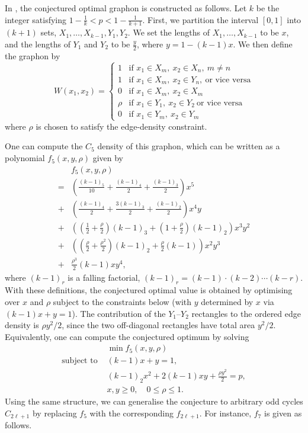 \documentclass{article}
\theoremstyle{plain}
\theoremstyle{definition}
\theoremstyle{remark}
\begin{document}
In \citet{bennett2020minimizing}, the conjectured optimal graphon is constructed as follows.
Let $k$ be the integer satisfying $1 - \frac{1}{k} < p < 1-\frac{1}{k+1}$.
First, we partition the interval $[0,1]$ into $(k+1)$ sets, $X_1, \ldots, X_{k-1}, Y_1, Y_2$.
We set the lengths of $X_1,\ldots,X_{k-1}$ to be $x$, and the lengths of $Y_1$ and $Y_2$ to be $\frac{y}{2}$, where $y=1-(k-1)x$.
We then define the graphon by
\[
  W(x_1, x_2) = \begin{cases}
    1 & \text{if } x_1 \in X_m,\ x_2 \in X_n,\ m \neq n
    \\
    1 & \text{if } x_1 \in X_m,\ x_2 \in Y_n,\ \text{or vice versa}
    \\
    0 & \text{if } x_1 \in X_m,\ x_2 \in X_m
    \\
    \rho & \text{if } x_1 \in Y_1,\ x_2 \in Y_2\ \text{or vice versa}
    \\
    0 & \text{if } x_1 \in Y_m,\ x_2 \in Y_m
  \end{cases}
\]
where $\rho$ is chosen to satisfy the edge-density constraint.

One can compute the $C_5$ density of this graphon, which can be written as a polynomial $f_5(x, y, \rho)$ given by
\begin{align*}
    &f_5(x, y, \rho)
    \\
    {} = &\left(\frac{(k-1)_5}{10} + \frac{(k-1)_4}{2} + \frac{(k-1)_3}{2} \right)x^5
    \\
    {} + &\left( \frac{(k-1)_4}{2} + \frac{3(k-1)_3}{2} + \frac{(k-1)_2}{2}\right)x^4 y
    \\
    {} + &\left(\left(\frac{1}{2} + \frac{\rho}{2}\right) (k-1)_3 + \left(1 + \frac{\rho}{2}\right) (k-1)_2\right) x^3 y^2
    \\
    {} + &\left( \left(\frac{\rho}{2} + \frac{\rho^2}{2}\right) (k-1)_2 + \frac{\rho}{2}(k-1) \right) x^2 y^3
    \\
    {} + &\frac{\rho^3}{2} (k-1) xy^4,
\end{align*}
where $(k-1)_r$ is a falling factorial, $(k-1)_r = (k-1) \cdot (k-2) \cdots (k-r)$. 
With these definitions, the conjectured optimal value is obtained by optimising over $x$ and $\rho$ subject to the constraints below (with $y$ determined by $x$ via $(k-1)x + y = 1$).
The contribution of the $Y_1$--$Y_2$ rectangles to the ordered edge density is $\rho y^2/2$, since the two off-diagonal rectangles have total area $y^2/2$.
Equivalently, one can compute the conjectured optimum by solving
\begin{align*}
    &\min f_5(x, y, \rho)
    \\
  \text{subject to } & (k-1) x + y = 1, 
    \\
    & (k-1)_2 x^2 + 2 (k-1) xy + \frac{\rho y^2}{2} = p,
    \\
    & x, y \ge 0, \quad 0 \le \rho \le 1.
\end{align*}
Using the same structure, we can generalise the conjecture to arbitrary odd cycles $C_{2\ell+1}$ by replacing $f_5$ with the corresponding $f_{2\ell+1}$.
For instance, $f_7$ is given as follows.
\end{document}
